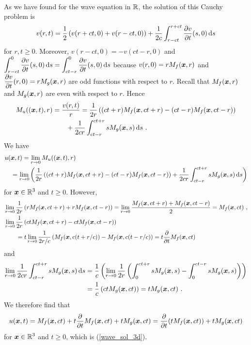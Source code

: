 \begin{rmk}
As we have found for the wave equation in $\RR$, the solution of this
Cauchy problem is
\[
v(r,t) = \frac{1}{2}\left(v(r+ct,0)+v(r-ct,0)\right)
+\frac{1}{2c} \int_{r-ct}^{r+ct} \pdydx{v}{t}(s,0)\dx{s}
\]
for $r,t \geq 0$.  Moreover, $v(r-ct,0) = -v(ct-r,0)$
and $\displaystyle \int_{r-ct}^0 \pdydx{v}{t}(s,0)\dx{s} =
\int_{ct-r}^{0} \pdydx{v}{t}(s,0)\dx{s}$ because
$v(r,0) = rM_f(\VEC{x},r)$ and
$\displaystyle \pdydx{v}{t}(r,0) = rM_g(\VEC{x},r)$ are odd functions
with respect to $r$.  Recall that $M_f(\VEC{x},r)$ and $M_g(\VEC{x},r)$
are even with respect to $r$.  Hence
\begin{align*}
M_u((\VEC{x},t),r) &= \frac{v(r,t)}{r}
 = \frac{1}{2r}\left( (ct+r)M_f(\VEC{x},ct+r)
- (ct-r)M_f(\VEC{x},ct-r) \right) \\
&\qquad + \frac{1}{2cr} \int_{ct-r}^{ct+r} s M_g(\VEC{x},s) \dx{s} \ .
\end{align*}
We have
\begin{align*}
&u(\VEC{x},t) = \lim_{r\rightarrow 0} M_u((\VEC{x},t),r) \\
&\quad = \lim_{r\rightarrow 0} \left( \frac{1}{2r}\left( (ct+r)M_f(\VEC{x},ct+r)
- (ct-r)M_f(\VEC{x},ct-r) \right) + \frac{1}{2cr}
\int_{ct-r}^{ct+r} s M_g(\VEC{x},s) \dx{s}\right)
\end{align*}
for $\VEC{x} \in \RR^3$ and $t\geq 0$.   However,
\begin{align*}
&\lim_{r\rightarrow 0} \frac{1}{2r}\left( r M_f(\VEC{x},ct+r)
+rM_f(\VEC{x},ct-r) \right)
= \lim_{r\rightarrow 0} \frac{M_f(\VEC{x},ct+r)
+M_f(\VEC{x},ct-r)}{2} = M_f(\VEC{x},ct) \ , \\
&\lim_{r\rightarrow 0} \frac{1}{2r}\left( ct M_f(\VEC{x},ct+r)
- ct M_f(\VEC{x},ct-r)\right) \\
&\qquad = t \lim_{r\rightarrow 0} \frac{1}{2r/c}\left( M_f(\VEC{x},c(t+r/c))
- M_f(\VEC{x},c(t-r/c)\right) =  t \pdfdx{ M_f(\VEC{x},ct) }{t}
\end{align*}
and
\begin{align*}
\lim_{r\rightarrow 0} \frac{1}{2cr} \int_{ct-r}^{ct+r} s M_g(\VEC{x},s)
\dx{s}
&= \frac{1}{c} \left(
\lim_{r\rightarrow 0} \frac{1}{2r} \left( \int_0^{ct+r} s M_g(\VEC{x},s)
- \int_0^{ct-r} s M_g(\VEC{x},s)\right) \right) \\
&= \frac{1}{c} \left( ct  M_g(\VEC{x},ct) \right)
= t  M_g(\VEC{x},ct) \ .
\end{align*}
We therefore find that
\[
u(\VEC{x},t) = M_f(\VEC{x},ct) + t \pdfdx{ M_f(\VEC{x},ct) }{t} +
tM_g(\VEC{x},ct)
= \pdfdx{ \left(t M_f(\VEC{x},ct)\right) }{t} + tM_g(\VEC{x},ct)
\]
for $\displaystyle \VEC{x}\in \RR^3$ and $t \geq 0$, which is
(\ref{wave_sol_3d}).
\end{rmk}

